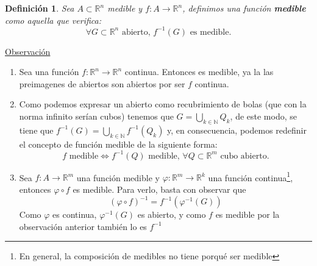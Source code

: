 \documentclass[10pt,a4paper,openright]{book}
\theoremstyle{break}
\newtheorem*{defi}{Definición}
\begin{document}
\begin{defi}
Sea $A \subset \mathbb{R}^n$ medible y $f: A \rightarrow \mathbb{R}^n$, definimos una función \textbf{medible} como aquella que verifica:
$$\forall G \subset \mathbb{R}^n \text{ abierto, } f^{-1}(G) \text{ es medible}.$$ 
\end{defi}

\underline{Observación}
\begin{enumerate}
\item Sea una función $f: \mathbb{R}^n \to \mathbb{R}^n$ continua. Entonces es medible, ya la las preimagenes de abiertos son abiertos por ser $f$ continua.

\item Como podemos expresar un abierto como recubrimiento de bolas (que con la norma infinito serían cubos) tenemos que $G = \bigcup_{k \in \mathbb{N}} Q_k$, de este modo, se tiene que $f^{-1}\left( G \right) = \bigcup_{k \in \mathbb{N}}f^{-1}\left( Q_k \right)$ y, en consecuencia, podemos redefinir el concepto de función medible de la siguiente forma:
$$f \text{ medible} \Leftrightarrow f^{-1}\left( Q \right) \text{ medible, } \forall Q \subset \mathbb{R}^m \text{ cubo abierto.}$$

\item Sea $f: A \to \mathbb{R}^m$ una función medible y $\varphi: \mathbb{R}^m \to \mathbb{R}^k$ una función continua\footnote{En general, la composición de medibles no tiene porqué ser medible}, entonces $\varphi \circ f$ es medible. Para verlo, basta con observar que 
$$\left( \varphi \circ f \right)^{-1} = f^{-1} \left( \varphi^{-1} (G) \right)$$
Como $\varphi$ es continua, $\varphi^{-1} (G)$ es abierto, y como $f$ es medible por la observación anterior también lo es $f^{-1}$
\end{enumerate}
\end{document}
